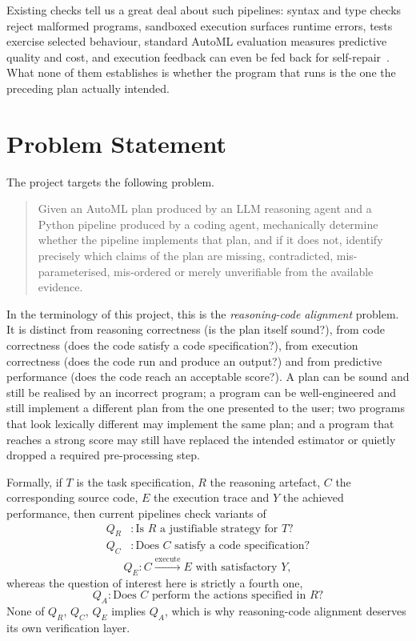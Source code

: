 Existing checks tell us a great deal about such pipelines: syntax and
type checks reject malformed programs, sandboxed execution surfaces
runtime errors, tests exercise selected behaviour, standard AutoML
evaluation measures predictive quality and cost, and execution
feedback can even be fed back for self-repair~\cite{selfrefine,
critic}. What none of them establishes is whether the program that
runs is the one the preceding plan actually intended.

\section{Problem Statement}

The project targets the following problem.

\begin{quote}
Given an AutoML plan produced by an LLM reasoning agent and a Python
pipeline produced by a coding agent, mechanically determine whether
the pipeline implements that plan, and if it does not, identify
precisely which claims of the plan are missing, contradicted,
mis-parameterised, mis-ordered or merely unverifiable from the
available evidence.
\end{quote}

In the terminology of this project, this is the
\emph{reasoning-code alignment} problem. It is distinct from
reasoning correctness (is the plan itself sound?), from code
correctness (does the code satisfy a code specification?), from
execution correctness (does the code run and produce an output?)
and from predictive performance (does the code reach an acceptable
score?). A plan can be sound and still be realised by an incorrect
program; a program can be well-engineered and still implement a
different plan from the one presented to the user; two programs that
look lexically different may implement the same plan; and a program
that reaches a strong score may still have replaced the intended
estimator or quietly dropped a required pre-processing step.

Formally, if $T$ is the task specification, $R$ the reasoning
artefact, $C$ the corresponding source code, $E$ the execution trace
and $Y$ the achieved performance, then current pipelines check
variants of
\[
\begin{aligned}
Q_R &: \text{Is } R \text{ a justifiable strategy for } T?\\
Q_C &: \text{Does } C \text{ satisfy a code specification?}
\end{aligned}
\]
\[
Q_E : C \xrightarrow{\text{execute}} E \text{ with satisfactory } Y,
\]
whereas the question of interest here is strictly a fourth one,
\[
Q_A : \text{Does } C \text{ perform the actions specified in } R?
\]
None of $Q_R$, $Q_C$, $Q_E$ implies $Q_A$, which is why
reasoning-code alignment deserves its own verification layer.

